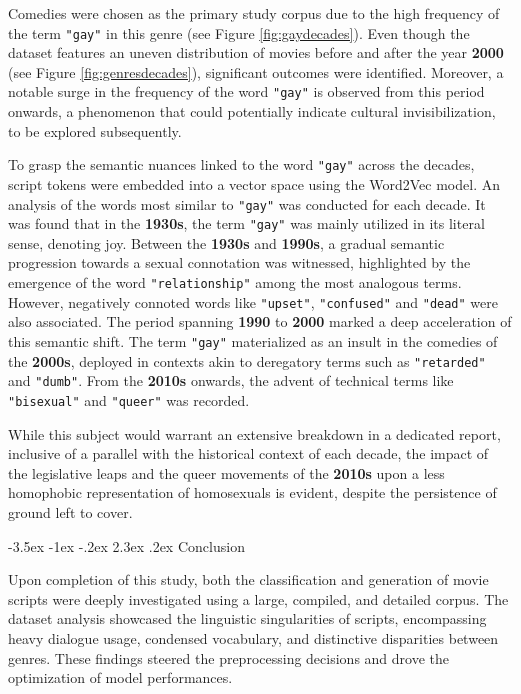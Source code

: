 \documentclass[12pt]{report}
\makeatletter
\renewcommand{\chapter}{\@startsection{chapter}{0}{\z@}
  {-3.5ex \@plus -1ex \@minus -.2ex}
  {2.3ex \@plus.2ex}
  {\normalfont\LARGE\bfseries}}
\makeatother
\begin{document}
Comedies were chosen as the primary study corpus due to the high frequency of the term \texttt{"gay"} in this genre (see Figure \ref{fig:gaydecades}). Even though the dataset features an uneven distribution of movies before and after the year \textbf{2000} (see Figure \ref{fig:genresdecades}), significant outcomes were identified. Moreover, a notable surge in the frequency of the word \texttt{"gay"} is observed from this period onwards, a phenomenon that could potentially indicate cultural invisibilization, to be explored subsequently. 

To grasp the semantic nuances linked to the word \texttt{"gay"} across the decades, script tokens were embedded into a vector space using the Word2Vec model. An analysis of the words most similar to \texttt{"gay"} was conducted for each decade. It was found that in the \textbf{1930s}, the term \texttt{"gay"} was mainly utilized in its literal sense, denoting joy. Between the \textbf{1930s} and \textbf{1990s}, a gradual semantic progression towards a sexual connotation was witnessed, highlighted by the emergence of the word \texttt{"relationship"} among the most analogous terms. However, negatively connoted words like \texttt{"upset"}, \texttt{"confused"} and \texttt{"dead"} were also associated. The period spanning \textbf{1990} to \textbf{2000} marked a deep acceleration of this semantic shift. The term \texttt{"gay"} materialized as an insult in the comedies of the \textbf{2000s}, deployed in contexts akin to deregatory terms such as \texttt{"retarded"} and \texttt{"dumb"}. From the \textbf{2010s} onwards, the advent of technical terms like \texttt{"bisexual"} and \texttt{"queer"} was recorded. 

While this subject would warrant an extensive breakdown in a dedicated report, inclusive of a parallel with the historical context of each decade, the impact of the legislative leaps and the queer movements of the \textbf{2010s} upon a less homophobic representation of homosexuals is evident, despite the persistence of ground left to cover. 

\chapter{Conclusion}

Upon completion of this study, both the classification and generation of movie scripts were deeply investigated using a large, compiled, and detailed corpus. The dataset analysis showcased the linguistic singularities of scripts, encompassing heavy dialogue usage, condensed vocabulary, and distinctive disparities between genres. These findings steered the preprocessing decisions and drove the optimization of model performances.
\end{document}
